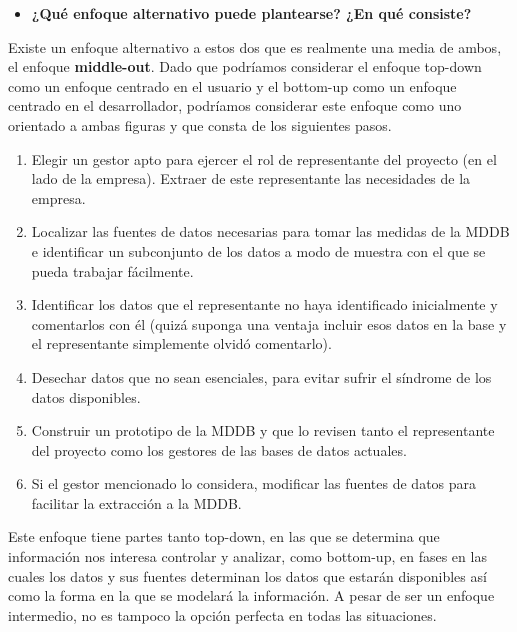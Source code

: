 \documentclass[paper=a4, fontsize=11pt]{scrartcl} %
\begin{document}
\begin{itemize}
\item \textbf{¿Qué enfoque alternativo puede plantearse? ¿En qué consiste?}
\end{itemize}
Existe un enfoque alternativo a estos dos que es realmente una media de ambos, el enfoque \textbf{middle-out}. Dado que podríamos considerar el enfoque top-down como un enfoque centrado en el usuario y el bottom-up como un enfoque centrado en el desarrollador, podríamos considerar este enfoque como uno orientado a ambas figuras y que consta de los siguientes pasos.
	\begin{enumerate}
	\item Elegir un gestor apto para ejercer el rol de representante del proyecto (en el lado de la empresa). Extraer de este representante las necesidades de la empresa.
	\item Localizar las fuentes de datos necesarias para tomar las medidas de la MDDB e identificar un subconjunto de los datos a modo de muestra con el que se pueda trabajar fácilmente.
	\item Identificar los datos que el representante no haya identificado inicialmente y comentarlos con él (quizá suponga una ventaja incluir esos datos en la base y el representante simplemente olvidó comentarlo).
	\item Desechar datos que no sean esenciales, para evitar sufrir el síndrome de los datos disponibles.
	\item Construir un prototipo de la MDDB y que lo revisen tanto el representante del proyecto como los gestores de las bases de datos actuales.
	\item Si el gestor mencionado lo considera, modificar las fuentes de datos para facilitar la extracción a la MDDB.
	\end{enumerate}
Este enfoque tiene partes tanto top-down, en las que se determina que información nos interesa controlar y analizar, como bottom-up, en fases en las cuales los datos y sus fuentes determinan los datos que estarán disponibles así como la forma en la que se modelará la información. A pesar de ser un enfoque intermedio, no es tampoco la opción perfecta en todas las situaciones.
\end{document}
